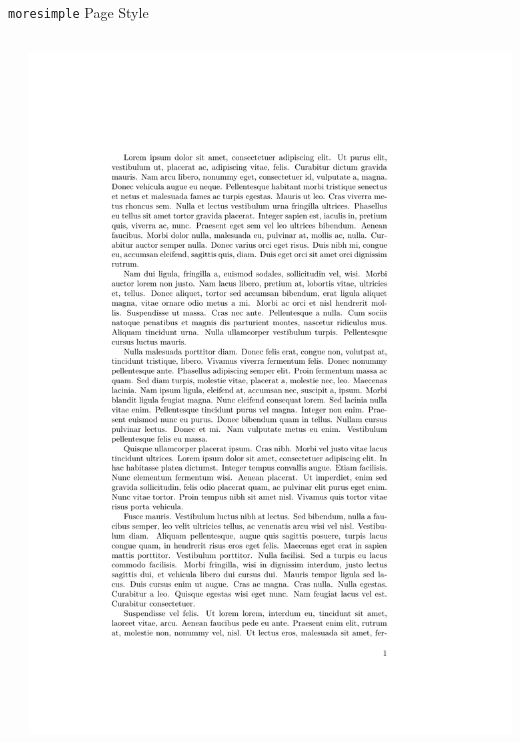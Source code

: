 \documentclass{beamer}
\begin{document}
\begin{frame}[fragile]{\texttt{moresimple} Page Style}
  \begin{columns}
    \begin{column}{0.6\textwidth}
      \begin{latexcode}
      \end{latexcode}
    \end{column}

    \begin{column}{0.4\textwidth}
      \begin{overprint}
        \includegraphics[frame,width=\linewidth]{moresimple-hf-1}

\end{overprint}
\end{column}
\end{columns}
\end{frame}
\end{document}
